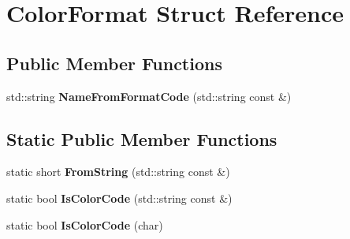 \hypertarget{struct_color_format}{}\section{Color\+Format Struct Reference}
\label{struct_color_format}
\subsection*{Public Member Functions}
\begin{DoxyCompactItemize}
\item 
\mbox{\label{struct_color_format_a9d83ea20f4d041a6cd128b678484f45c}} 
std\+::string {\bfseries Name\+From\+Format\+Code} (std\+::string const \&)
\end{DoxyCompactItemize}
\subsection*{Static Public Member Functions}
\begin{DoxyCompactItemize}
\item 
\mbox{\label{struct_color_format_aa92831627ae269a07f0223c0bb6491d8}} 
static short {\bfseries From\+String} (std\+::string const \&)
\item 
\mbox{\label{struct_color_format_ae12fce9b093d0486a43f83bfe4333a6c}} 
static bool {\bfseries Is\+Color\+Code} (std\+::string const \&)
\item 
\mbox{\label{struct_color_format_ab835f1f2dd0d58b2d31133f33e232c0a}} 
static bool {\bfseries Is\+Color\+Code} (char)
\end{DoxyCompactItemize}
